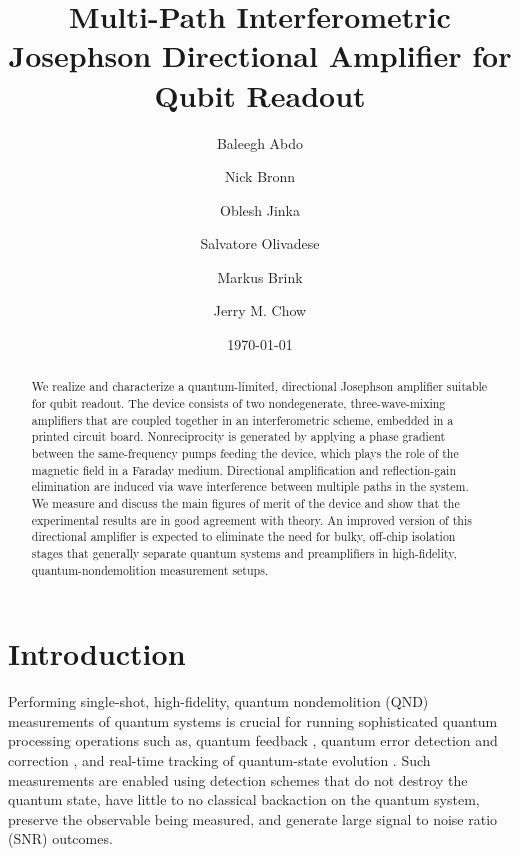 \documentclass[aip,onecolumn,10pt]{revtex4}%
\begin{document}
	\title{Multi-Path Interferometric Josephson Directional Amplifier for Qubit Readout}
	\author{Baleegh Abdo}
	\author{Nick Bronn}
	\author{Oblesh Jinka}
	\author{Salvatore Olivadese}
	\author{Markus Brink}
	\author{Jerry M. Chow}
	\date{\today}
	 

\begin{abstract}
We realize and characterize a quantum-limited, directional Josephson amplifier suitable for qubit readout. The device consists of two nondegenerate, three-wave-mixing amplifiers that are coupled together in an interferometric scheme, embedded in a printed circuit board. Nonreciprocity is generated by applying a phase gradient between the same-frequency pumps feeding the device, which plays the role of the magnetic field in a Faraday medium. Directional amplification and reflection-gain elimination are induced via wave interference between multiple paths in the system. We measure and discuss the main figures of merit of the device and show that the experimental results are in good agreement with theory. An improved version of this directional amplifier is expected to eliminate the need for bulky, off-chip isolation stages that generally separate quantum systems and preamplifiers in high-fidelity, quantum-nondemolition measurement setups.   
\end{abstract}

\maketitle

\newpage



\section{Introduction}
Performing single-shot, high-fidelity, quantum nondemolition (QND) measurements of quantum systems is crucial for running sophisticated quantum processing operations such as, quantum feedback \cite{JPADicarloReset,RabiVijay}, quantum error detection and correction \cite{FeedbackJPC}, and real-time tracking of quantum-state evolution \cite{FluxoniumJumps,JPCparity}. Such measurements are enabled using detection schemes that do not destroy the quantum state, have little to no classical backaction on the quantum system, preserve the observable being measured, and generate large signal to noise ratio (SNR) outcomes. 
\end{document}
